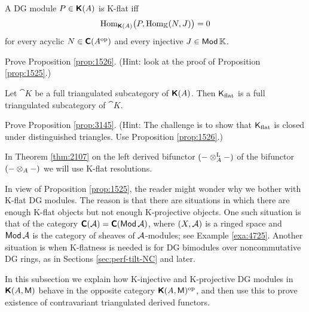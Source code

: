 \begin{prop} \label{prop:1526}
A DG module $P \in \dcat{K}(A)$ is K-flat iff 
\[ \opn{Hom}_{\dcat{K}(A)} \bigl(P, \opn{Hom}_{\K}(N, J) \bigr) = 0 \]
for every acyclic $N \in \dcat{C}(A^{\mrm{op}})$ and every injective 
$J \in \cat{Mod} \K$.
\end{prop}

\begin{exer}
Prove Proposition \ref{prop:1526}. (Hint: look at the proof of Proposition 
\ref{prop:1525}.)
\end{exer}

\begin{prop} \label{prop:3145}
Let $\cat{K}$ be a full triangulated subcategory of $\bcat{K}(A)$.
Then $\cat{K}_{\mrm{flat}}$ is a full triangulated subcategory of
$\cat{K}$. 
\end{prop}

\begin{exer} \label{exer:3145}
Prove Proposition \ref{prop:3145}. (Hint: The challenge is to show that 
$\cat{K}_{\mrm{flat}}$ is closed under distinguished triangles. 
Use Proposition \ref{prop:1526}.)
\end{exer}

In Theorem \ref{thm:2107} on the left derived bifunctor 
$(- \ot^{\mrm{L}}_{A} -)$ of the bifunctor $(- \ot_A -)$ we will use K-flat 
resolutions. 

\begin{rem} \label{rem:1525} 
In view of Proposition \ref{prop:1525}, the reader might wonder why we bother 
with K-flat DG modules. The reason is that there are situations in which there 
are enough K-flat objects but not enough K-projective objects. One such 
situation is that of the category 
$\dcat{C}(\mcal{A}) = \dcat{C}(\cat{Mod} \mcal{A})$,
where $(X, \mcal{A})$ is a ringed space and $\cat{Mod} \mcal{A}$
is the category of sheaves of $\AA$-modules; see Example \ref{exa:4725}. 
Another situation is when K-flatness is needed is for DG bimodules over 
noncommutative DG rings, as in Sections \ref{sec:perf-tilt-NC} and later.
\end{rem}



\label{subsec:resol-op}

In this subsection we explain how K-injective and K-projective DG modules in 
$\dcat{K}(A, \cat{M})$ behave in the opposite category 
$\dcat{K}(A, \cat{M})^{\mrm{op}}$, and then use this 
to prove existence of contravariant triangulated derived functors.

